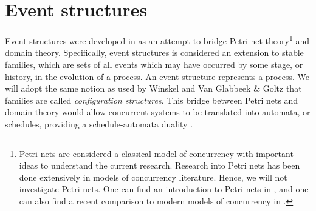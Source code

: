 \section{Event structures}
\label{sec:event-structures}
    Event structures were developed in \cite{winskel80events} as an attempt to bridge Petri net theory\footnote{Petri nets are considered a classical model of concurrency with important ideas to understand the current research. Research into Petri nets has been done extensively in models of concurrency literature. Hence, we will not investigate Petri nets. One can find an introduction to Petri nets in \cite{Petri73petrinets}, and one can also find a recent comparison to modern models of concurrency in \cite{Goubault18RelationshipsModelsForConcurrency}.} and domain theory. Specifically, event structures is considered an extension to stable families, which are sets of all events which may have occurred by some stage, or history, in the evolution of a process. An event structure represents a process. We will adopt the same notion as used by Winskel \cite{NielsenPW81eventstructures} and Van Glabbeek $\&$ Goltz \cite{GlabbeekP09configStruct} that families are called \emph{configuration structures}. This bridge between Petri nets and domain theory would allow concurrent systems to be translated into automata, or schedules, providing a schedule-automata duality \cite{NielsenPW81eventstructures, GlabbeekP09configStruct}.
    
    

